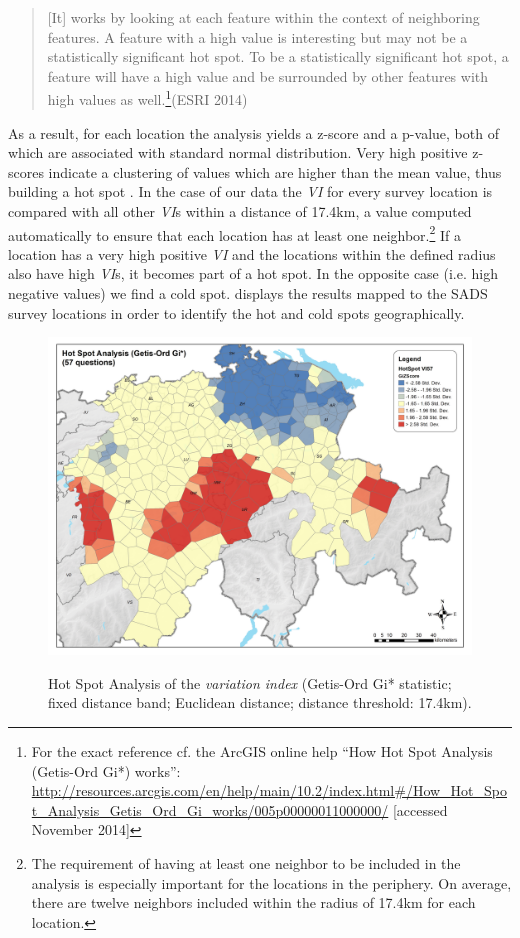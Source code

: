 \documentclass[output=paper]{LSP/langsci}
\begin{document}
\begin{quote}[It] works by looking at each feature within the context of neighboring features. A feature with a high value is interesting but may not be a statistically significant hot spot. To be a statistically significant hot spot, a feature will have a high value and be surrounded by other features with high values as well.\footnote{For the exact reference cf. the ArcGIS online help “How Hot Spot Analysis (Getis-Ord Gi*) works”: \url{http://resources.arcgis.com/en/help/main/10.2/index.html\#/How\_Hot\_Spot\_Analysis\_Getis\_Ord\_Gi\_works/005p00000011000000/} [accessed November 2014]}(ESRI 2014)
\end{quote}

As a result, for each location the analysis yields a z-score and a p-value, both of which are associated with standard normal distribution. Very high positive z-scores indicate a clustering of values which are higher than the mean value, thus building a hot spot \citep[65]{sibler_visualisierung_2011}. In the case of our data the \emph{VI} for every survey location is compared with all other \emph{VI}s within a distance of 17.4km, a value computed automatically to ensure that each location has at least one neighbor.\footnote{The requirement of having at least one neighbor to be included in the analysis is especially important for the locations in the periphery. On average, there are twelve neighbors included within the radius of 17.4km for each location.} If a location has a very high positive \emph{VI} and the locations within the defined radius also have high \emph{VI}s, it becomes part of a hot spot. In the opposite case (i.e. high negative values) we find a cold spot.  displays the results mapped to the SADS survey locations in order to identify the hot and cold spots geographically.

\begin{figure}
\includegraphics[width=\textwidth]{illustrations/stoeck_fig6}
\label{fig:6}
\caption{Hot Spot Analysis of the \emph{variation index} (Getis-Ord Gi* statistic; fixed distance band; Euclidean distance; distance threshold: 17.4km).}
\end{figure}
\end{document}
